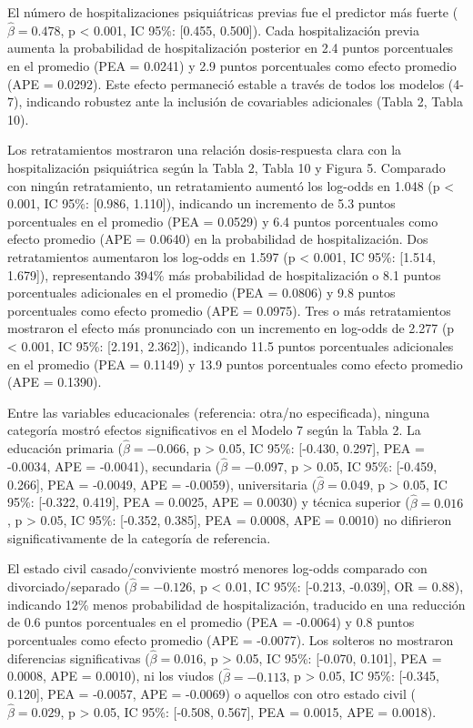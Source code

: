 \documentclass[
  spanish,
  10pt,
]{article}
\begin{document}
El número de hospitalizaciones psiquiátricas previas fue el predictor
más fuerte (\(\hat{\beta} = 0.478\), p \textless{} 0.001, IC 95\%:
{[}0.455, 0.500{]}). Cada hospitalización previa aumenta la probabilidad
de hospitalización posterior en 2.4 puntos porcentuales en el promedio
(PEA = 0.0241) y 2.9 puntos porcentuales como efecto promedio (APE =
0.0292). Este efecto permaneció estable a través de todos los modelos
(4-7), indicando robustez ante la inclusión de covariables adicionales
(Tabla 2, Tabla 10).

Los retratamientos mostraron una relación dosis-respuesta clara con la
hospitalización psiquiátrica según la Tabla 2, Tabla 10 y Figura 5.
Comparado con ningún retratamiento, un retratamiento aumentó los
log-odds en 1.048 (p \textless{} 0.001, IC 95\%: {[}0.986, 1.110{]}),
indicando un incremento de 5.3 puntos porcentuales en el promedio (PEA =
0.0529) y 6.4 puntos porcentuales como efecto promedio (APE = 0.0640) en
la probabilidad de hospitalización. Dos retratamientos aumentaron los
log-odds en 1.597 (p \textless{} 0.001, IC 95\%: {[}1.514, 1.679{]}),
representando 394\% más probabilidad de hospitalización o 8.1 puntos
porcentuales adicionales en el promedio (PEA = 0.0806) y 9.8 puntos
porcentuales como efecto promedio (APE = 0.0975). Tres o más
retratamientos mostraron el efecto más pronunciado con un incremento en
log-odds de 2.277 (p \textless{} 0.001, IC 95\%: {[}2.191, 2.362{]}),
indicando 11.5 puntos porcentuales adicionales en el promedio (PEA =
0.1149) y 13.9 puntos porcentuales como efecto promedio (APE = 0.1390).

Entre las variables educacionales (referencia: otra/no especificada),
ninguna categoría mostró efectos significativos en el Modelo 7 según la
Tabla 2. La educación primaria (\(\hat{\beta} = -0.066\), p
\textgreater{} 0.05, IC 95\%: {[}-0.430, 0.297{]}, PEA = -0.0034, APE =
-0.0041), secundaria (\(\hat{\beta} = -0.097\), p \textgreater{} 0.05,
IC 95\%: {[}-0.459, 0.266{]}, PEA = -0.0049, APE = -0.0059),
universitaria (\(\hat{\beta} = 0.049\), p \textgreater{} 0.05, IC 95\%:
{[}-0.322, 0.419{]}, PEA = 0.0025, APE = 0.0030) y técnica superior
(\(\hat{\beta} = 0.016\), p \textgreater{} 0.05, IC 95\%: {[}-0.352,
0.385{]}, PEA = 0.0008, APE = 0.0010) no difirieron significativamente
de la categoría de referencia.

El estado civil casado/conviviente mostró menores log-odds comparado con
divorciado/separado (\(\hat{\beta} = -0.126\), p \textless{} 0.01, IC
95\%: {[}-0.213, -0.039{]}, OR = 0.88), indicando 12\% menos
probabilidad de hospitalización, traducido en una reducción de 0.6
puntos porcentuales en el promedio (PEA = -0.0064) y 0.8 puntos
porcentuales como efecto promedio (APE = -0.0077). Los solteros no
mostraron diferencias significativas (\(\hat{\beta} = 0.016\), p
\textgreater{} 0.05, IC 95\%: {[}-0.070, 0.101{]}, PEA = 0.0008, APE =
0.0010), ni los viudos (\(\hat{\beta} = -0.113\), p \textgreater{} 0.05,
IC 95\%: {[}-0.345, 0.120{]}, PEA = -0.0057, APE = -0.0069) o aquellos
con otro estado civil (\(\hat{\beta} = 0.029\), p \textgreater{} 0.05,
IC 95\%: {[}-0.508, 0.567{]}, PEA = 0.0015, APE = 0.0018).
\end{document}
